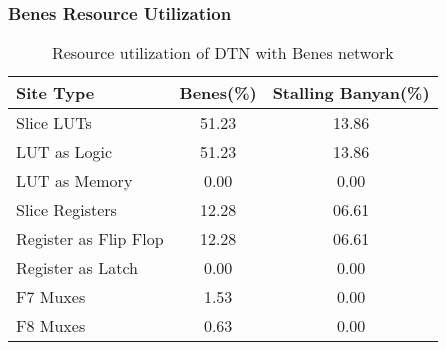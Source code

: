 \begin{frame}[shrink=20]
\frametitle{Benes Resource Utilization}

\begin{table}
	\begin{tabular}{l | c | c }
		\textbf{Site Type}  & \textbf{Benes(\%)}&\textbf{Stalling Banyan(\%)} \\
		\hline \hline
		Slice LUTs          & 51.23             & 13.86 \\
		\quad LUT as Logic  & 51.23             & 13.86 \\
		\quad LUT as Memory & 0.00              & 0.00  \\
		Slice Registers     & 12.28             & 06.61 \\
		\quad Register as Flip Flop & 12.28     & 06.61 \\
		\quad Register as Latch     & 0.00      & 0.00  \\
		F7 Muxes                    & 1.53      & 0.00  \\
		F8 Muxes                    & 0.63      & 0.00 \\
	\end{tabular}
	\caption{Resource utilization of DTN with Benes network}
\end{table}

\end{frame}

